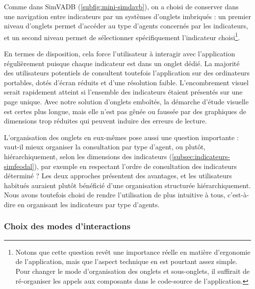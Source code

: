 Comme dans SimVADB (\cref{subfig:mini-simdavb}), on a choisi de conserver dans \simedb{} une navigation entre indicateurs par un systèmes d'onglets imbriqués : un premier niveau d'onglets permet d'accéder au type d'agents concernés par les indicateurs, et un second niveau permet de sélectionner spécifiquement l'indicateur choisi\footnote{
	Notons que cette question revêt une importance réelle en matière d'ergonomie de l'application, mais que l'aspect technique en est pourtant assez simple.
	Pour changer le mode d'organisation des onglets et sous-onglets, il suffirait de ré-organiser les appels aux composants dans le code-source de l'application.
}.

En termes de disposition, cela force l'utilisateur à interagir avec l'application régulièrement puisque chaque indicateur est dans un onglet dédié.
La majorité des utilisateurs potentiels de \simedb{} consultent toutefois l'application sur des ordinateurs portables, dotés d'écran réduits et d'une résolution faible.
L'encombrement visuel serait rapidement atteint si l'ensemble des indicateurs étaient présentés sur une page unique.
Avec notre solution d'onglets emboîtés, la démarche d'étude visuelle est certes plus longue, mais elle n'est pas gênée ou faussée par des graphiques de dimensions trop réduites qui peuvent induire des erreurs de lecture.


L'organisation des onglets en eux-mêmes pose aussi une question importante : vaut-il mieux organiser la consultation par type d'agent, ou plutôt, hiérarchiquement, selon les \og dimensions\fg{} des indicateurs (\cref{subsec:indicateurs-simfeodal}), par exemple en respectant l'ordre de consultation des indicateurs déterminé ?
Les deux approches présentent des avantages, et les utilisateurs habitués auraient plutôt bénéficié d'une organisation structurée hiérarchiquement.
Nous avons toutefois choisi de rendre l'utilisation de \simedb{} plus intuitive à tous, c'est-à-dire en organisant les indicateurs par type d'agents.

\subsubsection{Choix des modes d'interactions \label{sssec:modes-interaction}}

